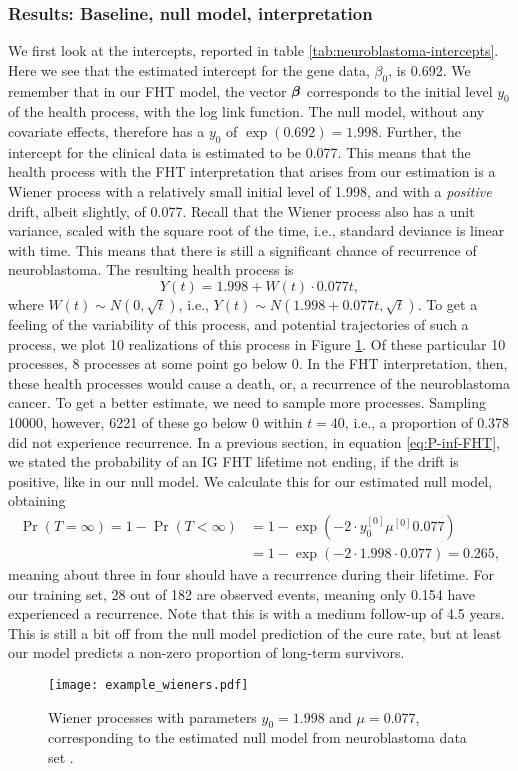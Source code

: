\subsubsection{Results: Baseline, null model, interpretation}
We first look at the intercepts, reported in table \ref{tab:neuroblastoma-intercepts}.
Here we see that the estimated intercept for the gene data, $\beta_0$, is 0.692.
We remember that in our FHT model, the vector $\boldsymbol{\beta}$ corresponds to the initial level $y_0$ of the health process, with the log link function.
The null model, without any covariate effects, therefore has a $y_0$ of $\exp(0.692)=1.998$.
Further, the intercept for the clinical data is estimated to be 0.077.
This means that the health process with the FHT interpretation that arises from our estimation is a Wiener process with a relatively small initial level of 1.998, and with a \textit{positive} drift, albeit slightly, of 0.077.
Recall that the Wiener process also has a unit variance, scaled with the square root of the time, i.e., standard deviance is linear with time.
This means that there is still a significant chance of recurrence of neuroblastoma.
The resulting health process is
\begin{equation}
    Y(t)=1.998+W(t)\cdot0.077t,
\end{equation}
where $W(t)\sim N(0,\sqrt{t})$,
i.e.,
$Y(t)\sim N(1.998+0.077t,\sqrt{t})$.
To get a feeling of the variability of this process, and potential trajectories of such a process, we plot 10 realizations of this process in Figure \ref{fig:neuroblastoma-wiener}.
Of these particular 10 processes, 8 processes at some point go below 0.
In the FHT interpretation, then, these health processes would cause a death, or, a recurrence of the neuroblastoma cancer.
To get a better estimate, we need to sample more processes.
Sampling 10000, however, 6221 of these go below 0 within $t=40$, i.e., a proportion of 0.378 did not experience recurrence.
In a previous section, in equation \eqref{eq:P-inf-FHT}, we stated the probability of an IG FHT lifetime not ending, if the drift is positive, like in our null model.
We calculate this for our estimated null model, obtaining
\begin{align*}
    \Pr{(T=\infty)}=1-\Pr{(T<\infty)}&=1-\exp{(-2\cdot y_0^{[0]}\mu^{[0]} 0.077)}\\
    &=1-\exp{(-2\cdot 1.998\cdot 0.077)}=0.265,
\end{align*}
meaning about three in four should have a recurrence during their lifetime.
For our training set, 28 out of 182 are observed events, meaning only 0.154 have experienced a recurrence.
Note that this is with a medium follow-up of 4.5 years.
This is still a bit off from the null model prediction of the cure rate, but at least our model predicts a non-zero proportion of long-term survivors.
\begin{figure}\label{fig:neuroblastoma-wiener}
\caption{Wiener processes with parameters $y_0=1.998$ and $\mu=0.077$, corresponding to the estimated null model from neuroblastoma data set \citep{oberthuer-data}.}
\centering\texttt{[image: example\_wieners.pdf]}
\end{figure}




